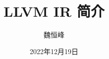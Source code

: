 \documentclass[]{beamer}
\title[语义分析]{LLVM IR 简介}
\author[魏恒峰]{\large 魏恒峰}
\institute{hfwei@nju.edu.cn}
\date{2022年12月19日}
\begin{document}
\maketitle




\thankyou{}

\end{document}
